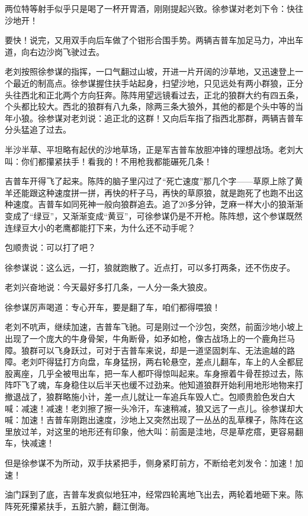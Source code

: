 \par 两位特等射手似乎只是喝了一杯开胃酒，刚刚提起兴致。徐参谋对老刘下令：快往沙地开！
\par 要快！说完，又用双手向后车做了个钳形合围手势。两辆吉普车加足马力，冲出车道，向右边沙岗飞驶过去。
\par 老刘按照徐参谋的指挥，一口气翻过山坡，开进一片开阔的沙草地，又迅速登上一个最近的制高点。徐参谋握住扶手站起身，扫望沙地，只见远处有两小群狼，正分头往西北和正北两个方向狂奔。陈阵用望远镜看过去，正北的狼群大约有四五条，个头都比较大。西北的狼群有八九条，除两三条大狼外，其他的都是个头中等的当年小狼。徐参谋对老刘说：追正北的这群！又向后车指了指西北那群，两辆吉普车分头猛追了过去。
\par 半沙半草、平坦略有起伏的沙地草场，正是军吉普车放胆冲锋的理想战场。老刘大叫：你们都攥紧扶手！看我的！不用枪我都能碾死几条！
\par 吉普车开得飞了起来。陈阵的脑子里闪过了“死亡速度”那几个字——草原上除了黄羊还能跟这种速度拼一拼，再快的杆子马，再快的草原狼，就是跑死了也跑不出这种速度。吉普车如同死神一般向狼群追去。追了20多分钟，芝麻一样大小的狼渐渐变成了“绿豆”，又渐渐变成“黄豆”，可徐参谋仍是不开枪。陈阵想，这个参谋既然连绿豆大小的老鹰都能打下来，为什么还不动手呢？
\par 包顺贵说：可以打了吧？
\par 徐参谋说：这么远，一打，狼就跑散了。近点打，可以多打两条，还不伤皮子。
\par 老刘兴奋地说：今天最好多打几条，一人分一条大狼皮。
\par 徐参谋厉声喝道：专心开车，要是翻了车，咱们都得喂狼！
\par 老刘不吭声，继续加速，吉普车飞驰。可是刚过一个沙包，突然，前面沙地小坡上出现了一个庞大的牛身骨架，牛角断骨，如矛如枪，像古战场上的一个鹿角拦马障。狼群可以飞身跃过，可对于吉普车来说，却是一道坚固刺车、无法逾越的路障。老刘吓得猛打方向盘，车身猛拐，两右轮悬空，差点儿翻车，车上的人全都屁股离座，几乎全被甩出车，把一车人都吓得惊叫起来。车身擦着牛骨茬掠过去，陈阵吓飞了魂，车身稳住以后半天也缓不过劲来。他知道狼群开始利用地形地物来打撤退战了，狼群略施小计，差一点儿就让一车追兵车毁人亡。包顺贵脸色发白大喊：减速！减速！老刘擦了擦一头冷汗，车速稍减，狼又远了一点儿。徐参谋却大喊：加速！吉普车刚跑出速度，沙地上又突然出现了一丛丛的乱草稞子，陈阵在这里放过羊，对这里的地形还有印象，他大叫：前面是洼地，尽是草疙瘩，更容易翻车，快减速！
\par 但是徐参谋不为所动，双手扶紧把手，侧身紧盯前方，不断给老刘发令：加速！加速！
\par 油门踩到了底，吉普车发疯似地狂冲，经常四轮离地飞出去，两轮着地砸下来。陈阵死死攥紧扶手，五脏六腑，翻江倒海。
